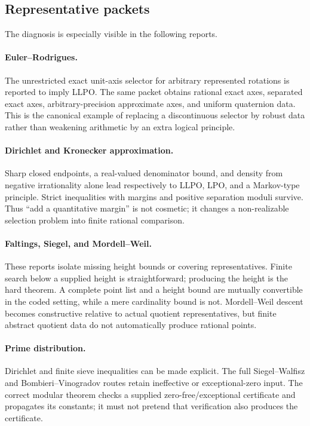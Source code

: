 \subsection{Representative packets}

The diagnosis is especially visible in the following reports.

\paragraph{Euler--Rodrigues.}
The unrestricted exact unit-axis selector for arbitrary represented rotations
is reported to imply LLPO.  The same packet obtains rational exact axes,
separated exact axes, arbitrary-precision approximate axes, and uniform
quaternion data.  This is the canonical example of replacing a discontinuous
selector by robust data rather than weakening arithmetic by an extra logical
principle.

\paragraph{Dirichlet and Kronecker approximation.}
Sharp closed endpoints, a real-valued denominator bound, and density from
negative irrationality alone lead respectively to LLPO, LPO, and a Markov-type
principle.  Strict inequalities with margins and positive separation moduli
survive.  Thus ``add a quantitative margin'' is not cosmetic; it changes a
non-realizable selection problem into finite rational comparison.

\paragraph{Faltings, Siegel, and Mordell--Weil.}
These reports isolate missing height bounds or covering representatives.
Finite search below a supplied height is straightforward; producing the height
is the hard theorem.  A complete point list and a height bound are mutually
convertible in the coded setting, while a mere cardinality bound is not.
Mordell--Weil descent becomes constructive relative to actual quotient
representatives, but finite abstract quotient data do not automatically
produce rational points.

\paragraph{Prime distribution.}
Dirichlet and finite sieve inequalities can be made explicit.  The full
Siegel--Walfisz and Bombieri--Vinogradov routes retain ineffective or
exceptional-zero input.  The correct modular theorem checks a supplied
zero-free/exceptional certificate and propagates its constants; it must not
pretend that verification also produces the certificate.

